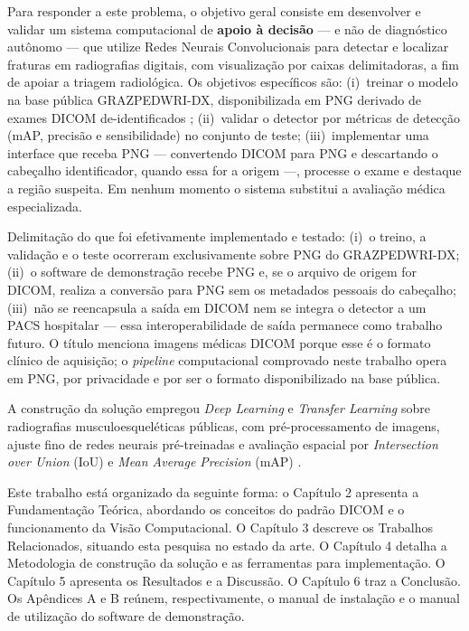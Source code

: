 \documentclass[12pt,oneside,a4paper,chapter=TITLE,section=TITLE,sumario=tradicional]{abntex2}
\begin{document}
Para responder a este problema, o objetivo geral consiste em desenvolver e validar um sistema computacional de \textbf{apoio à decisão} --- e não de diagnóstico autônomo --- que utilize Redes Neurais Convolucionais para detectar e localizar fraturas em radiografias digitais, com visualização por caixas delimitadoras, a fim de apoiar a triagem radiológica. Os objetivos específicos são: (i)~treinar o modelo na base pública GRAZPEDWRI-DX, disponibilizada em PNG derivado de exames DICOM de-identificados \cite{nagy2022grazpedwri}; (ii)~validar o detector por métricas de detecção (mAP, precisão e sensibilidade) no conjunto de teste; (iii)~implementar uma interface que receba PNG --- convertendo DICOM para PNG e descartando o cabeçalho identificador, quando essa for a origem ---, processe o exame e destaque a região suspeita. Em nenhum momento o sistema substitui a avaliação médica especializada.

Delimitação do que foi efetivamente implementado e testado: (i)~o treino, a validação e o teste ocorreram exclusivamente sobre PNG do GRAZPEDWRI-DX; (ii)~o software de demonstração recebe PNG e, se o arquivo de origem for DICOM, realiza a conversão para PNG sem os metadados pessoais do cabeçalho; (iii)~não se reencapsula a saída em DICOM nem se integra o detector a um PACS hospitalar --- essa interoperabilidade de saída permanece como trabalho futuro. O título menciona imagens médicas DICOM porque esse é o formato clínico de aquisição; o \textit{pipeline} computacional comprovado neste trabalho opera em PNG, por privacidade e por ser o formato disponibilizado na base pública.

A construção da solução empregou \textit{Deep Learning} e \textit{Transfer Learning} sobre radiografias musculoesqueléticas públicas, com pré-processamento de imagens, ajuste fino de redes neurais pré-treinadas e avaliação espacial por \textit{Intersection over Union} (IoU) e \textit{Mean Average Precision} (mAP) \cite{litjens2017survey,redmon2016you,nagy2022grazpedwri}.

Este trabalho está organizado da seguinte forma: o Capítulo 2 apresenta a Fundamentação Teórica, abordando os conceitos do padrão DICOM e o funcionamento da Visão Computacional. O Capítulo 3 descreve os Trabalhos Relacionados, situando esta pesquisa no estado da arte. O Capítulo 4 detalha a Metodologia de construção da solução e as ferramentas para implementação. O Capítulo 5 apresenta os Resultados e a Discussão. O Capítulo 6 traz a Conclusão. Os Apêndices A e B reúnem, respectivamente, o manual de instalação e o manual de utilização do software de demonstração.
\end{document}
